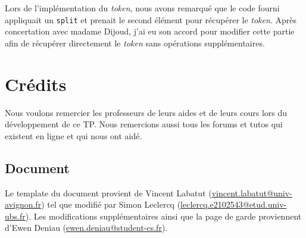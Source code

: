 \documentclass{ceri/sty/rapport}
\begin{document}
\begin{beware}[Remarque]
Lors de l'implémentation du \textit{token}, nous avons remarqué que le code fourni appliquait un \texttt{split} et prenait le second élément pour récupérer le \textit{token}.
Après concertation avec madame Dijoud, j'ai eu son accord pour modifier cette partie afin de récupérer directement le \textit{token} sans opérations supplémentaires.
\end{beware}

\section{Crédits}
Nous voulons remercier les professeurs de leurs aides et de leurs cours lors du développement de ce TP.
Nous remercions aussi tous les forums et tutos qui existent en ligne et qui nous ont aidé.

\subsection{Document}
Le template du document provient de Vincent Labatut (\url{vincent.labatut@univ-avignon.fr}) tel que modifié par Simon Leclercq (\url{leclercq.e2102543@etud.univ-ubs.fr}).
Les modifications supplémentaires ainsi que la page de garde proviennent d'Ewen Deniau (\url{ewen.deniau@student-cs.fr}).

\nocite{*}
\end{document}
